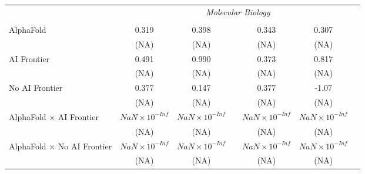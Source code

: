 \begin{tabular}{lcccccc}
 & \multicolumn{6}{c}{\textit{Molecular Biology}} \\ \\
   AlphaFold                                                                  & 0.319                  & 0.398                  &                        & 0.343                  & 0.307                  &   \\   
                                                                              & (NA)                   & (NA)                   &                        & (NA)                   & (NA)                   &   \\   
   AI Frontier                                                                & 0.491                  & 0.990                  &                        & 0.373                  & 0.817                  &   \\   
                                                                              & (NA)                   & (NA)                   &                        & (NA)                   & (NA)                   &   \\   
   No AI Frontier                                                             & 0.377                  & 0.147                  &                        & 0.377                  & -1.07                  &   \\   
                                                                              & (NA)                   & (NA)                   &                        & (NA)                   & (NA)                   &   \\   
   AlphaFold $\times$ AI Frontier                                             & $NaN\times 10^{-Inf}$  & $NaN\times 10^{-Inf}$  &                        & $NaN\times 10^{-Inf}$  & $NaN\times 10^{-Inf}$  &   \\   
                                                                              & (NA)                   & (NA)                   &                        & (NA)                   & (NA)                   &   \\   
   AlphaFold $\times$ No AI Frontier                                          & $NaN\times 10^{-Inf}$  & $NaN\times 10^{-Inf}$  &                        & $NaN\times 10^{-Inf}$  & $NaN\times 10^{-Inf}$  &   \\   
                                                                              & (NA)                   & (NA)                   &                        & (NA)                   & (NA)                   &   \\   

\end{tabular}
